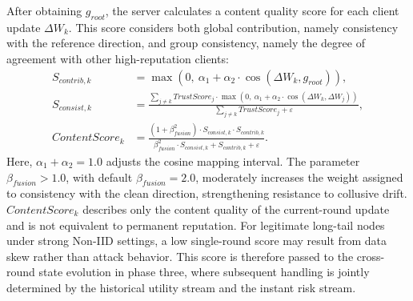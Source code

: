 \documentclass[runningheads,orivec]{llncs}
\begin{document}
After obtaining $g_{root}$, the server calculates a content quality score for each client update $\Delta W_k$. This score considers both global contribution, namely consistency with the reference direction, and group consistency, namely the degree of agreement with other high-reputation clients:
\begin{align}
    S_{contrib,k}    & = \max\left(0,\ \alpha_{1} + \alpha_{2} \cdot \cos(\Delta W_{k}, g_{root})\right),                                                                                             \\
    S_{consist,k}    & = \frac{\sum_{j\neq k} TrustScore_{j} \cdot \max\left(0,\ \alpha_{1} + \alpha_{2} \cdot \cos(\Delta W_{k}, \Delta W_{j})\right)}{\sum_{j\neq k} TrustScore_{j} + \varepsilon}, \\
    ContentScore_{k} & = \frac{(1 + \beta_{fusion}^{2}) \cdot S_{consist,k} \cdot S_{contrib,k}}{\beta_{fusion}^{2}\cdot S_{consist,k} + S_{contrib,k} + \varepsilon}.
\end{align}
Here, $\alpha_1+\alpha_2=1.0$ adjusts the cosine mapping interval. The parameter $\beta_{fusion}>1.0$, with default $\beta_{fusion}=2.0$, moderately increases the weight assigned to consistency with the clean direction, strengthening resistance to collusive drift. $ContentScore_k$ describes only the content quality of the current-round update and is not equivalent to permanent reputation. For legitimate long-tail nodes under strong Non-IID settings, a low single-round score may result from data skew rather than attack behavior. This score is therefore passed to the cross-round state evolution in phase three, where subsequent handling is jointly determined by the historical utility stream and the instant risk stream.
\end{document}

